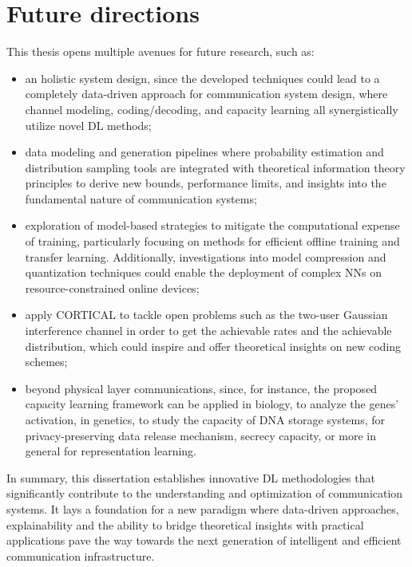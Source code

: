 \section*{Future directions}
This thesis opens multiple avenues for future research, such as: 
\begin{itemize}
    \item an holistic system design, since the developed techniques could lead to a completely data-driven approach for communication system design, where channel modeling, coding/decoding, and capacity learning all synergistically utilize novel DL methods;
    \item data modeling and generation pipelines where probability estimation and distribution sampling tools are integrated with theoretical information theory principles to derive new bounds, performance limits, and insights into the fundamental nature of communication systems;
    \item exploration of model-based strategies to mitigate the computational expense of training, particularly focusing on methods for efficient offline training and transfer learning. Additionally, investigations into model compression and quantization techniques could enable the deployment of complex NNs on resource-constrained online devices;
    \item apply CORTICAL to tackle open problems such as the two-user Gaussian interference channel in order to get the achievable rates and the achievable distribution, which could inspire and offer theoretical insights on new coding schemes;
    \item beyond physical layer communications, since, for instance, the proposed capacity learning framework can be applied in biology, to analyze the genes’ activation, in genetics, to study the capacity of DNA storage systems, for privacy-preserving data release mechanism, secrecy capacity, or more in general for representation learning. 
\end{itemize}


In summary, this dissertation establishes innovative DL methodologies that significantly contribute to the understanding and optimization of communication systems. It lays a foundation for a new paradigm where data-driven approaches, explainability and the ability to bridge theoretical insights with practical applications pave the way towards the next generation of intelligent and efficient communication infrastructure.
